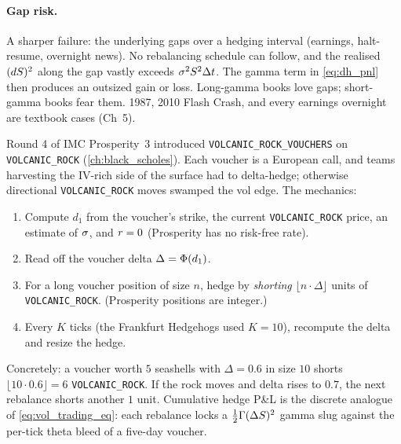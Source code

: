 \paragraph{Gap risk.}
A sharper failure: the underlying gaps over a hedging interval
(earnings, halt-resume, overnight news). No rebalancing schedule
can follow, and the realised $(dS)^2$ along the gap vastly
exceeds $\sigma^2 S^2 \Delta t$. The gamma term in
\eqref{eq:dh_pnl} then produces an outsized gain or loss.
Long-gamma books love gaps; short-gamma books fear them. 1987,
2010 Flash Crash, and every earnings overnight are textbook cases
(\citeBennett Ch~5).

\begin{prosperitybox}
Round 4 of IMC Prosperity~3 introduced
\texttt{VOLCANIC\_ROCK\_VOUCHERS} on \texttt{VOLCANIC\_ROCK}
(\cref{ch:black_scholes}). Each voucher is a European call, and
teams harvesting the IV-rich side of the surface had to delta-hedge;
otherwise directional \texttt{VOLCANIC\_ROCK} moves swamped
the vol edge. The mechanics:
\begin{enumerate}
  \item Compute $d_1$ from the voucher's strike, the current
  \texttt{VOLCANIC\_ROCK} price, an estimate of $\sigma$, and
  $r = 0$ (Prosperity has no risk-free rate).
  \item Read off the voucher delta $\Delta = \Phi(d_1)$.
  \item For a long voucher position of size $n$, hedge by
  \emph{shorting} $\lfloor n \cdot \Delta\rfloor$ units of
  \texttt{VOLCANIC\_ROCK}. (Prosperity positions are integer.)
  \item Every $K$ ticks (the Frankfurt Hedgehogs used $K = 10$),
  recompute the delta and resize the hedge.
\end{enumerate}
Concretely: a voucher worth $5$ seashells with $\Delta = 0.6$ in
size $10$ shorts $\lfloor 10 \cdot 0.6 \rfloor = 6$
\texttt{VOLCANIC\_ROCK}. If the rock moves and delta rises to
$0.7$, the next rebalance shorts another $1$ unit. Cumulative
hedge P\&L is the discrete analogue of \eqref{eq:vol_trading_eq}:
each rebalance locks a $\tfrac12 \Gamma (\Delta S)^2$ gamma
slug against the per-tick theta bleed of a five-day voucher.
\end{prosperitybox}

